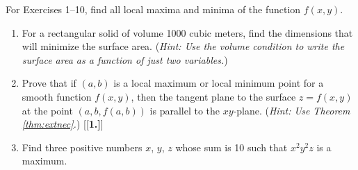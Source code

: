 \startexercises\label{sec2dot5}
\par\noindent For Exercises 1--10, find all local maxima and minima of the function $f(x,y)$.
\begin{enumerate}[\bfseries 1.]
[{[\bfseries 1.]}]
 \item For a rectangular solid of volume 1000 cubic meters, find the dimensions that will minimize the surface
 area. (\emph{Hint: Use the volume condition to write the surface area as a function of just two variables.})
 \item Prove that if $(a,b)$ is a local maximum or local minimum point for a smooth function
  $f(x,y)$, then the tangent plane to the surface $z=f(x,y)$ at the point $(a,b,f(a,b))$ is parallel to the $xy$-plane.
  (\emph{Hint: Use Theorem \ref{thm:extnec}.})
[{[\bfseries 1.]}]
 \item Find three positive numbers $x$, $y$, $z$ whose sum is 10 such that $x^2 y^2 z$ is a maximum.
\end{enumerate}
\newpage

